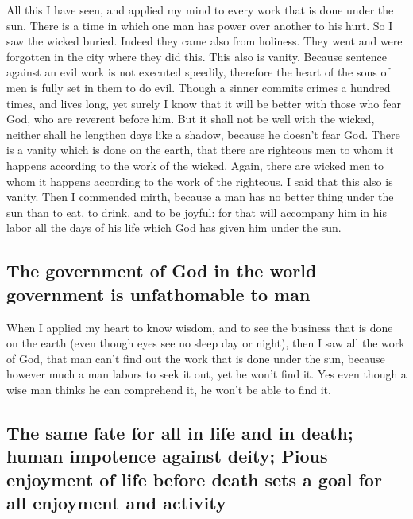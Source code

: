  All this I have seen, and applied my mind to every work
that is done under the sun. There is a time in which one man has power
over another to his hurt.  So I saw the wicked buried.
Indeed they came also from holiness. They went and were forgotten in the
city where they did this. This also is vanity.  Because
sentence against an evil work is not executed speedily, therefore the
heart of the sons of men is fully set in them to do evil.
 Though a sinner commits crimes a hundred times, and
lives long, yet surely I know that it will be better with those who fear
God, who are reverent before him.  But it shall not be
well with the wicked, neither shall he lengthen days like a shadow,
because he doesn't fear God.  There is a vanity which is
done on the earth, that there are righteous men to whom it happens
according to the work of the wicked. Again, there are wicked men to whom
it happens according to the work of the righteous. I said that this also
is vanity.  Then I commended mirth, because a man has no
better thing under the sun than to eat, to drink, and to be joyful: for
that will accompany him in his labor all the days of his life which God
has given him under the sun.

\hypertarget{the-government-of-god-in-the-world-government-is-unfathomable-to-man}{%
\subsection{The government of God in the world government is
unfathomable to
man}\label{the-government-of-god-in-the-world-government-is-unfathomable-to-man}}

 When I applied my heart to know wisdom, and to see the
business that is done on the earth (even though eyes see no sleep day or
night),  then I saw all the work of God, that man can't
find out the work that is done under the sun, because however much a man
labors to seek it out, yet he won't find it. Yes even though a wise man
thinks he can comprehend it, he won't be able to find it.

\hypertarget{the-same-fate-for-all-in-life-and-in-death-human-impotence-against-deity-pious-enjoyment-of-life-before-death-sets-a-goal-for-all-enjoyment-and-activity}{%
\subsection{The same fate for all in life and in death; human impotence
against deity; Pious enjoyment of life before death sets a goal for all
enjoyment and
activity}\label{the-same-fate-for-all-in-life-and-in-death-human-impotence-against-deity-pious-enjoyment-of-life-before-death-sets-a-goal-for-all-enjoyment-and-activity}}

